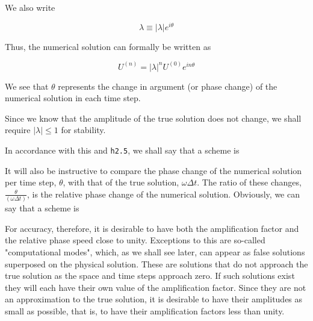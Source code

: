 We also write

\[\lambda \equiv | \lambda |e^{i\theta}\]

Thus, the numerical solution can formally be written as

\[U^{( n )} = | \lambda |^{n}U^{( 0 )}e^{i n \theta}\]

We see that \(\theta\) represents the change in argument (or phase
change) of the numerical solution in each time step.

Since we know that the amplitude of the true solution does not change,
we shall require \(| \lambda | \leq 1\) for stability.

In accordance with this and \texttt{h2.5}, we shall say that a scheme is


It will also be instructive to compare the phase change of the numerical
solution per time step, \(\theta\), with that of the true solution,
\(\omega\Delta t\). The ratio of these changes,
\(\frac{\theta}{(\omega \Delta t)}\), is the relative phase change of
the numerical solution. Obviously, we can say that a scheme is


For accuracy, therefore, it is desirable to have both the amplification
factor and the relative phase speed close to unity. Exceptions to this
are so-called "computational modes", which, as we shall see later, can
appear as false solutions superposed on the physical solution. These are
solutions that do not approach the true solution as the space and time
steps approach zero. If such solutions exist they will each have their
own value of the amplification factor. Since they are not an
approximation to the true solution, it is desirable to have their
amplitudes as small as possible, that is, to have their amplification
factors less than unity.

